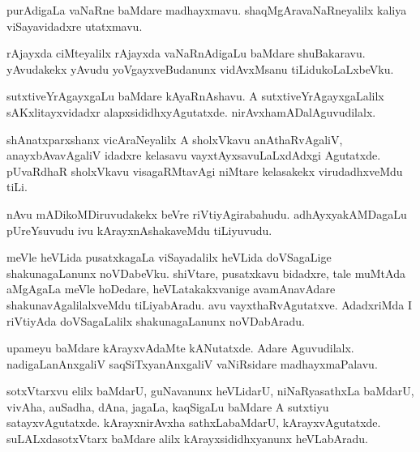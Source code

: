 \documentclass{article}
\begin{document}
\begin{mn}
purAdigaLa  vaNaRne  baMdare  madhayxmavu.  shaqMgAravaNaRneyalilx  kaliya  viSayavidadxre  utatxmavu.
\end{mn}
  
\begin{mn}
rAjayxda  ciMteyalilx  rAjayxda  vaNaRnAdigaLu  baMdare  shuBakaravu.  yAvudakekx  yAvudu  yoVgayxveBudanunx  
vidAvxMsanu  tiLidukoLaLxbeVku.
\end{mn}

\begin{mn}
sutxtiveYrAgayxgaLu  baMdare  kAyaRnAshavu.  A  sutxtiveYrAgayxgaLalilx  sAKxlitayxvidadxr  alapxsididhxyAgutatxde.  
nirAvxhamADalAguvudilalx.
\end{mn}

\begin{mn}
shAnatxparxshanx vicAraNeyalilx  A  sholxVkavu  anAthaRvAgaliV,  anayxbAvavAgaliV  idadxre  kelasavu  vayxtAyxsavuLaLxdAdxgi  
Agutatxde.  pUvaRdhaR  sholxVkavu  visagaRMtavAgi  niMtare  kelasakekx  virudadhxveMdu  tiLi.
\end{mn}

\begin{mn}
nAvu mADikoMDiruvudakekx  beVre  riVtiyAgirabahudu.  adhAyxyakAMDagaLu  pUreYsuvudu  ivu  kArayxnAshakaveMdu  tiLiyuvudu.
\end{mn}

\begin{mn}
meVle  heVLida  pusatxkagaLa  viSayadalilx  heVLida  doVSagaLige  shakunagaLanunx  noVDabeVku.  shiVtare,  pusatxkavu  
bidadxre,  tale  muMtAda  aMgAgaLa  meVle  hoDedare,  heVLatakakxvanige  avamAnavAdare  shakunavAgalilalxveMdu  
tiLiyabAradu.  avu  vayxthaRvAgutatxve.  AdadxriMda  I  riVtiyAda  doVSagaLalilx  shakunagaLanunx  noVDabAradu.
\end{mn}

\begin{mn}
upameyu  baMdare  kArayxvAdaMte  kANutatxde.  Adare  Aguvudilalx.  nadigaLanAnxgaliV  saqSiTxyanAnxgaliV  vaNiRsidare  madhayxmaPalavu.
\end{mn}

\begin{mn}
sotxVtarxvu  elilx  baMdarU,  guNavanunx  heVLidarU,  niNaRyasathxLa  baMdarU,  vivAha,  auSadha,  dAna,  jagaLa,  kaqSigaLu  baMdare  A  
sutxtiyu  satayxvAgutatxde. kArayxnirAvxha  sathxLabaMdarU,  kArayxvAgutatxde.  suLALxdasotxVtarx  baMdare  alilx  kArayxsididhxyanunx  heVLabAradu.
\end{mn}
\end{document}
